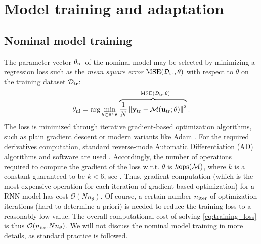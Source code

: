 \documentclass{article}
\newcommand{\nsamp}{{N}}
\newcommand{\npar}{{n_\theta}}
\newcommand{\M}{\mathcal{M}}
\newcommand{\D}{\mathcal{D}}
\newcommand{\R}{{\mathbb{R}}}
\newcommand{\tr}{{\rm{tr}}}
\newcommand{\ops}{\rm{ops}}
\newcommand{\nominal}{{\rm{nl}}}
\newcommand{\norm}[1]{\left\lVert#1\right\rVert}
\newcommand{\tvec}[1]{{\mathbf{#1}}}
\begin{document}
\section{Model training and adaptation} 
\label{sec:trainadapt}
\subsection{Nominal model training}
\label{sec:nominal_training}
The parameter vector $\theta_\nominal$ of the nominal model may be selected by minimizing a {regression loss} such as the \emph{mean square error} $\mathrm{MSE}(\D_{\tr}, \theta)$ with respect to $\theta$ on the training dataset
$\D_{\tr}$:
\begin{equation}
    \label{eq:training_loss}
    \theta_\nominal = \arg \min_{\theta \in \R^\npar} 
    \overbrace{\frac{1}{N}\norm{\tvec{y}_\tr - \M(\tvec{u}_\tr; \theta) }^2}^{=\mathrm{MSE}(\D_{\tr}, \theta)}.
\end{equation}
The loss is minimized through iterative gradient-based optimization algorithms, such as plain gradient descent or modern variants like Adam \cite{kingma2014adam}. For the required derivatives computation, standard reverse-mode Automatic Differentiation (AD) algorithms and software are used \cite{paszke2017automatic}. 
Accordingly, the number of operations required to compute the gradient of the loss w.r.t. $\theta$ is $k \ops(\M)$, where $k$ is a constant guaranteed to be $k < 6$, see \cite{baydin2017automatic}. Thus, gradient computation (which is the 
most expensive operation for each iteration of gradient-based optimization) for a RNN model has cost $\mathcal{O}(\nsamp \npar)$. 
Of course, a certain number $n_{\rm iter}$ of optimization iterations (hard to determine a priori) is needed
to reduce the training loss to a reasonably low value. The overall computational cost of solving \eqref{eq:training_loss} is thus $\mathcal{O}(n_{\rm iter} \nsamp \npar)$.
We will not discuss the nominal model training in more details, as standard practice is followed.
\end{document}
